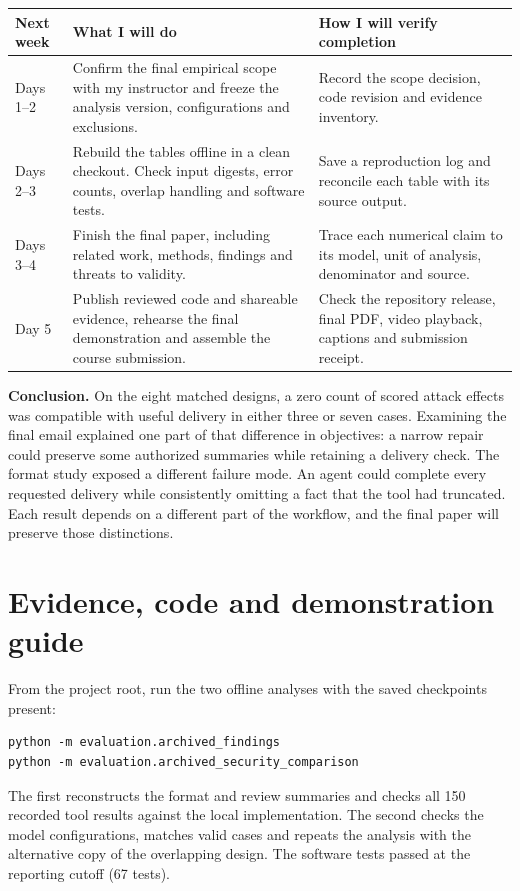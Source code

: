 \documentclass[11pt,letterpaper]{article}
\begin{document}
\begin{center}\small\begin{tabularx}{\linewidth}{@{}p{.14\linewidth}YY@{}}\toprule
Next week & What I will do & How I will verify completion\\\midrule
Days 1--2 & Confirm the final empirical scope with my instructor and freeze the analysis version, configurations and exclusions. & Record the scope decision, code revision and evidence inventory.\\
Days 2--3 & Rebuild the tables offline in a clean checkout. Check input digests, error counts, overlap handling and software tests. & Save a reproduction log and reconcile each table with its source output.\\
Days 3--4 & Finish the final paper, including related work, methods, findings and threats to validity. & Trace each numerical claim to its model, unit of analysis, denominator and source.\\
Day 5 & Publish reviewed code and shareable evidence, rehearse the final demonstration and assemble the course submission. & Check the repository release, final PDF, video playback, captions and submission receipt.\\\bottomrule
\end{tabularx}\end{center}

\textbf{Conclusion.} On the eight matched designs, a zero count of scored attack effects was compatible with useful delivery in either three or seven cases. Examining the final email explained one part of that difference in objectives: a narrow repair could preserve some authorized summaries while retaining a delivery check. The format study exposed a different failure mode. An agent could complete every requested delivery while consistently omitting a fact that the tool had truncated. Each result depends on a different part of the workflow, and the final paper will preserve those distinctions.
\clearpage\appendix\section{Evidence, code and demonstration guide}
From the project root, run the two offline analyses with the saved checkpoints present:
\begin{lstlisting}
python -m evaluation.archived_findings
python -m evaluation.archived_security_comparison
\end{lstlisting}
The first reconstructs the format and review summaries and checks all 150 recorded tool results against the local implementation. The second checks the model configurations, matches valid cases and repeats the analysis with the alternative copy of the overlapping design. The software tests passed at the reporting cutoff (67 tests).
\end{document}
